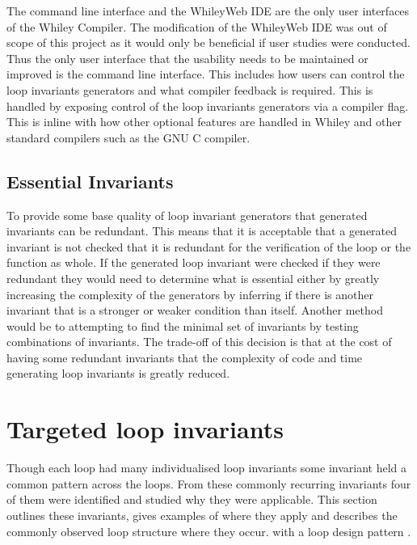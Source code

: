 The command line interface and the WhileyWeb IDE are the only user interfaces
of the Whiley Compiler.
The modification of the WhileyWeb IDE was out of scope of this project as it
would only be beneficial if user studies were conducted.
Thus the only user interface that the usability needs to be maintained or
improved is the command line interface.
This includes how users can control the loop invariants generators and what
compiler feedback is required.
This is handled by exposing control of the loop invariants generators via
a compiler flag.
This is inline with how other optional features are handled in Whiley and
other standard compilers such as the GNU C compiler.

\subsection{Essential Invariants}

To provide some base quality of loop invariant generators that generated invariants 
can be redundant.
This means that it is acceptable that a generated invariant is not
checked that it is redundant for the verification of the loop or the function
as whole.
If the generated loop invariant were checked if they were redundant
they would need to determine what is essential either by greatly increasing
the complexity of the generators by inferring if there is another invariant
that is a stronger or weaker condition than itself.
Another method would be to attempting to find the
minimal set of invariants by testing combinations of invariants.
The trade-off of this decision is that at the cost of having some redundant
invariants that the complexity of code and time generating loop invariants is
greatly reduced.

\section{Targeted loop invariants}

Though each loop had many individualised loop invariants some invariant held a
common pattern across the loops.
From these commonly recurring invariants four of them were identified and
studied why they were applicable.
This section outlines these invariants, gives examples of where they apply and
describes the commonly observed loop structure where they occur.
with a loop design pattern \cite{pattern-lang}.

